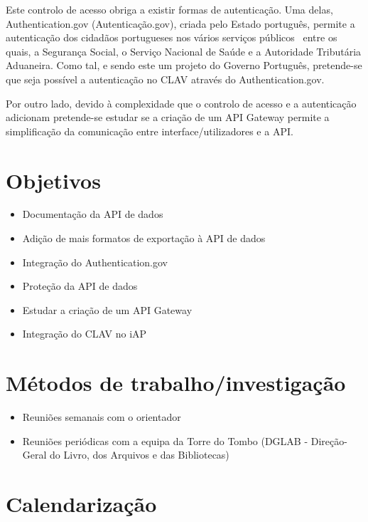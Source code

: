 \documentclass{article}
\begin{document}
Este controlo de acesso obriga a existir formas de autenticação. Uma delas, Authentication.gov (Autenticação.gov), criada pelo Estado português, permite a autenticação dos cidadãos portugueses nos vários serviços públicos~\cite{authgov} entre os quais, a Segurança Social, o Serviço Nacional de Saúde e a Autoridade Tributária Aduaneira. Como tal, e sendo este um projeto do Governo Português, pretende-se que seja possível a autenticação no CLAV através do Authentication.gov.

Por outro lado, devido à complexidade que o controlo de acesso e a autenticação adicionam pretende-se estudar se a criação de um API Gateway permite a simplificação da comunicação entre interface/utilizadores e a API. 

\section*{Objetivos}

\begin{itemize}
    \item Documentação da API de dados
    \item Adição de mais formatos de exportação à API de dados
    \item Integração do Authentication.gov
    \item Proteção da API de dados
    \item Estudar a criação de um API Gateway
    \item Integração do CLAV no iAP
\end{itemize}

\section*{Métodos de trabalho/investigação}

\begin{itemize}
    \item Reuniões semanais com o orientador
    \item Reuniões periódicas com a equipa da Torre do Tombo (DGLAB - Direção-Geral do Livro, dos Arquivos e das Bibliotecas)
\end{itemize}

\section*{Calendarização}
\end{document}
